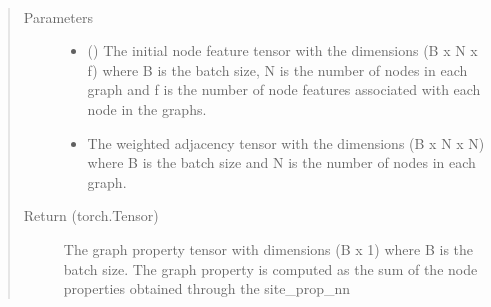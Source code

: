 \documentclass[letterpaper,10pt,english]{sphinxmanual}
\begin{document}
\begin{fulllineitems}
\begin{quote}
\begin{description}
\end{description}
\end{quote}

\begin{fulllineitems}
\label{\detokenize{modules/gqcml.nn:gqcml.nn.models.GraphConv_model.forward}}~\begin{quote}\begin{description}
\item[{Parameters}] \leavevmode\begin{itemize}
\item {} 
\sphinxstyleliteralstrong{\sphinxupquote{(}}\sphinxstyleliteralstrong{\sphinxupquote{)}} () \textendash{} The initial node feature tensor with the dimensions (B x N x f) where B is the batch
size, N is the number of nodes in each graph and f is the number of node features
associated with each node in the graphs.

\item {} 
\sphinxstyleliteralstrong{\sphinxupquote{(}}\sphinxstyleliteralstrong{\sphinxupquote{)}} \textendash{} The weighted adjacency tensor with the dimensions (B x N x N) where B is the batch
size and N is the number of nodes in each graph.

\end{itemize}

\item[{Return (torch.Tensor)}] \leavevmode
The graph property tensor with dimensions (B x 1) where B is the batch
size. The graph property is computed as the sum of the node properties obtained through the
site\_prop\_nn

\end{description}\end{quote}

\end{fulllineitems}


\begin{fulllineitems}
\label{\detokenize{modules/gqcml.nn:gqcml.nn.models.GraphConv_model.meta}}
\end{fulllineitems}


\end{fulllineitems}
\end{document}
